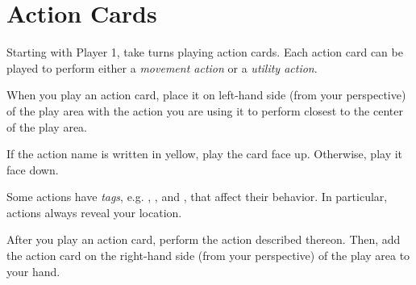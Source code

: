 \section*{Action Cards}
Starting with Player 1, take turns playing action cards.
Each action card can be played to perform either a \emph{movement action} or a \emph{utility action}.

When you play an action card, place it on left-hand side (from your perspective) of the play area with the action you are using it to perform closest to the center of the play area.

If the action name is written in yellow, play the card face up. Otherwise, play it face down.

Some actions have \emph{tags}, e.g.  \LOUD{}, \QUIET{}, and \DEEP{}, that affect their behavior. In particular, \LOUD{} actions always reveal your location.

After you play an action card, perform the action described thereon.
Then, add the action card on the right-hand side (from your perspective) of the play area to your hand.
